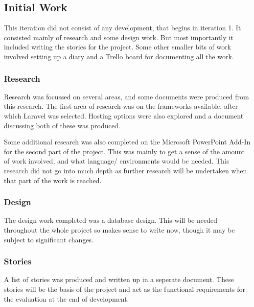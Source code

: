 \subsection{Initial Work}
This iteration did not consist of any development, that begins in iteration 1. It consisted mainly of research and some design work. But most importantly it included writing the stories for the project. Some other smaller bits of work involved setting up a diary and a Trello board for documenting all the work.
\subsubsection{Research}
Research was focussed on several areas, and some documents were produced from this research. The first area of research was on the frameworks available, after which Laravel was selected. Hosting options were also explored and a document discussing both of these was produced.

Some additional research was also completed on the Microsoft PowerPoint Add-In for the second part of the project. This was mainly to get a sense of the amount of work involved, and what language/ environments would be needed. This research did not go into much depth as further research will be undertaken when that part of the work is reached.
\subsubsection{Design}
The design work completed was a database design. This will be needed throughout the whole project so makes sense to write now, though it may be subject to significant changes.
\subsubsection{Stories}
A list of stories was produced and written up in a seperate document. These stories will be the basis of the project and act as the functional requirements for the evaluation at the end of development.
\newpage